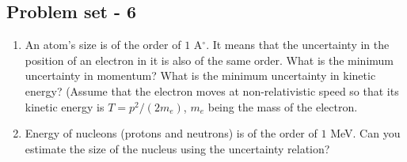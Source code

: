 \subsection{Problem set - 6}
\begin{enumerate}
\item An atom's size is of the order of $1$ A${}^\circ$. It means that the 
uncertainty in the position of an electron in it is also of the same order.
What is the minimum uncertainty in momentum? What is the minimum uncertainty in
kinetic energy? (Assume that the electron moves at non-relativistic speed so
that its kinetic energy is $T = p^2/(2m_e)$, $m_e$ being the mass of the 
electron.
\item Energy of nucleons (protons and neutrons) is of the order of $1$ MeV.
Can you estimate the size of the nucleus using the uncertainty relation?
\end{enumerate}


